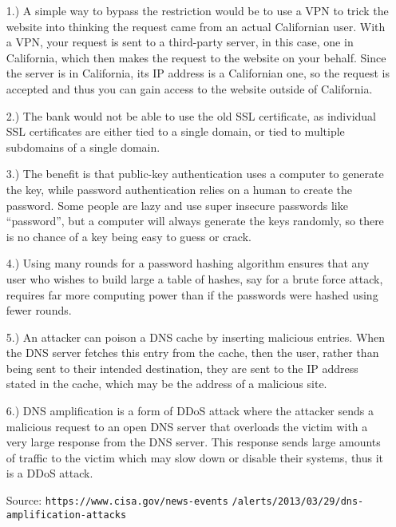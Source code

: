 \documentclass[12pt]{article}
\begin{document}
    \pagestyle{fancy}

    \begin{itemize}
        \item [1.)] A simple way to bypass the restriction would be to use a
        VPN to trick the website into thinking the request came from an
        actual Californian user.
        With a VPN, your request is sent to a third-party server, in this case,
        one in California, which then makes the request to the website on your
        behalf.
        Since the server is in California, its IP address is a Californian one,
        so the request is accepted and thus you can gain access to the website
        outside of California.

        \item [2.)] The bank would not be able to use the old SSL certificate,
        as individual SSL certificates are either tied to a single domain, or
        tied to multiple subdomains of a single domain.

        \item [3.)] The benefit is that public-key authentication uses a
        computer to generate the key, while password authentication relies on
        a human to create the password. Some people are lazy and use super
        insecure passwords like ``password'', but a computer will always
        generate the keys randomly, so there is no chance of a key being easy
        to guess or crack.

        \item [4.)] Using many rounds for a password hashing algorithm ensures
        that any user who wishes to build large a table of hashes, say for a
        brute force attack, requires far more computing power than if the
        passwords were hashed using fewer rounds.

        \item [5.)] An attacker can poison a DNS cache by inserting malicious
        entries. When the DNS server fetches this entry from the cache, then
        the user, rather than being sent to their intended destination, they
        are sent to the IP address stated in the cache, which may be the
        address of a malicious site.

        \item [6.)] DNS amplification is a form of DDoS attack where the
        attacker sends a malicious request to an open DNS server that overloads
        the victim with a very large response from the DNS server. This
        response sends large amounts of traffic to the victim which may slow
        down or disable their systems, thus it is a DDoS attack.

        \scriptsize Source: \verb|https://www.cisa.gov/news-events|
        \verb|/alerts/2013/03/29/dns-amplification-attacks|
    \end{itemize}
\end{document}
